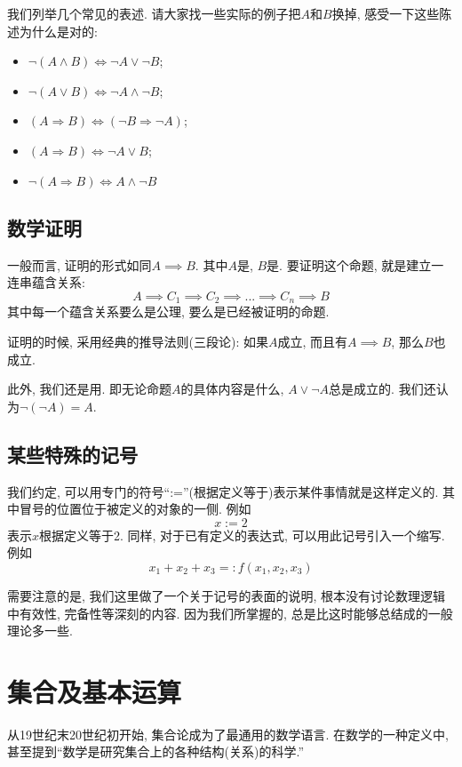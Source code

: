 \documentclass{ctexart}
\begin{document}
我们列举几个常见的表述. 请大家找一些实际的例子把$A$和$B$换掉, 感受一下这些陈述为什么是对的:

\begin{itemize}
    \item $\neg(A \wedge B) \Leftrightarrow \neg A \vee \neg B$;
    \item $\neg(A \vee B) \Leftrightarrow \neg A \wedge \neg B$;
    \item $(A \Rightarrow B) \Leftrightarrow(\neg B \Rightarrow \neg A)$;
    \item $(A \Rightarrow B) \Leftrightarrow \neg A \vee B$;
    \item $\neg(A \Rightarrow B) \Leftrightarrow A \wedge \neg B$
\end{itemize}

\subsection{数学证明} 一般而言, 证明的形式如同$A \implies B$. 其中$A$是, $B$是. 要证明这个命题, 就是建立一连串蕴含关系: 
\[
    A\implies C_1 \implies C_2 \implies ... \implies C_n \implies B
\]
其中每一个蕴含关系要么是公理, 要么是已经被证明的命题. 

证明的时候, 采用经典的推导法则(三段论): 如果$A$成立, 而且有$A\implies B$, 那么$B$也成立. 

此外, 我们还是用. 即无论命题$A$的具体内容是什么, $A \lor \lnot A$总是成立的. 我们还认为$\lnot (\lnot A)=A$. 

\subsection{某些特殊的记号} 我们约定, 可以用专门的符号``:=''(根据定义等于)表示某件事情就是这样定义的. 其中冒号的位置位于被定义的对象的一侧. 例如
\[
    x:=2
\]
表示$x$根据定义等于2. 同样, 对于已有定义的表达式, 可以用此记号引入一个缩写. 例如
\[
    x_1+x_2+x_3=:f(x_1,x_2,x_3)
\]

需要注意的是, 我们这里做了一个关于记号的表面的说明, 根本没有讨论数理逻辑中有效性, 完备性等深刻的内容. 因为我们所掌握的, 总是比这时能够总结成的一般理论多一些. 

\section{集合及基本运算} 从19世纪末20世纪初开始, 集合论成为了最通用的数学语言. 在数学的一种定义中, 甚至提到``数学是研究集合上的各种结构(关系)的科学.''
\end{document}
